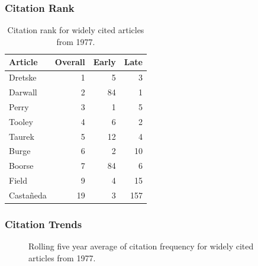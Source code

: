 \documentclass[
  10pt,
  letterpaper,
  DIV=11,
  numbers=noendperiod,
  twoside]{scrartcl}
\begin{document}
\subsubsection*{Citation Rank}\label{sec-rank-1977}

\begin{longtable}[]{@{}lrrr@{}}

\caption{\label{tbl-citation-rank-1977}Citation rank for widely cited
articles from 1977.}

\tabularnewline

\toprule\noalign{}
Article & Overall & Early & Late \\
\midrule\noalign{}
\endhead
\bottomrule\noalign{}
\endlastfoot
Dretske & 1 & 5 & 3 \\
Darwall & 2 & 84 & 1 \\
Perry & 3 & 1 & 5 \\
Tooley & 4 & 6 & 2 \\
Taurek & 5 & 12 & 4 \\
Burge & 6 & 2 & 10 \\
Boorse & 7 & 84 & 6 \\
Field & 9 & 4 & 15 \\
Castañeda & 19 & 3 & 157 \\

\end{longtable}

\subsubsection*{Citation Trends}\label{sec-trends-1977}

\begin{figure}


\caption{\label{fig-citation-spaghetti-1977}Rolling five year average of
citation frequency for widely cited articles from 1977.}

\end{figure}%
\end{document}
